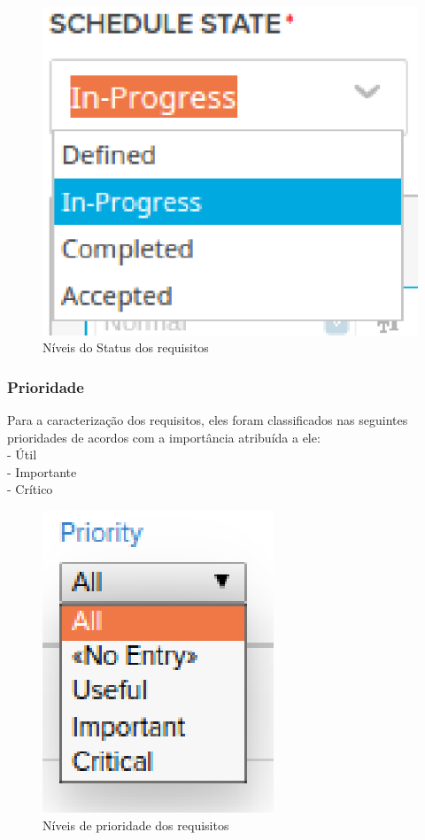 \begin{figure}[h]
    \centering
    \label{fig01}
        \includegraphics[keepaspectratio=true,scale=1]{figuras/RallyDev/status.eps}
    \caption{Níveis do Status dos requisitos}
\end{figure}

\subsubsection{Prioridade}

Para a caracterização dos requisitos, eles foram classificados nas seguintes prioridades de acordos com a importância atribuída a ele:\\
\tab - Útil\\
\tab - Importante\\
\tab - Crítico\\

\begin{figure}[h]
    \centering
    \label{fig01}
        \includegraphics[keepaspectratio=true,scale=1]{figuras/RallyDev/prioridade.eps}
    \caption{Níveis de prioridade dos requisitos}
\end{figure}

